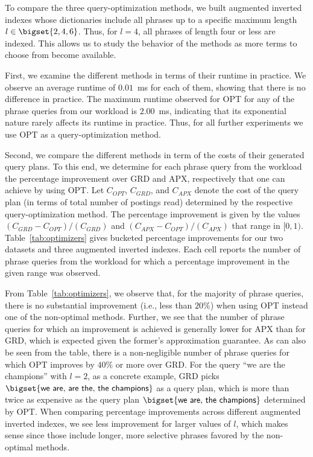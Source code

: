 To compare the three query-optimization methods, we built augmented
inverted indexes whose dictionaries include all phrases up to a
specific maximum length $l \in \bigset{2, 4, 6}$. Thus, for $l=4$, all
phrases of length four or less are indexed. This allows us to study
the behavior of the methods as more terms to choose from become
available.

First, we examine the different methods in terms of their runtime in
practice. We observe an average runtime of $0.01$~ms for each of them,
showing that there is no difference in practice. The maximum runtime
observed for OPT for any of the phrase queries from our workload is
$2.00$~ms, indicating that its exponential nature rarely affects its
runtime in practice. Thus, for all further experiments we use OPT as a
query-optimization method.

Second, we compare the different methods in term of the costs of their
generated query plans. To this end, we determine for each phrase query
from the workload the percentage improvement over GRD and APX,
respectively that one can achieve by using OPT. Let $C_{OPT}$,
$C_{GRD}$, and $C_{APX}$ denote the cost of the query plan (in terms
of total number of postings read) determined by the respective
query-optimization method. The percentage improvement is given by the
values $(C_{GRD} - C_{OPT})/(C_{GRD})$ and
$(C_{APX} - C_{OPT})/(C_{APX})$ that range in
$[0,1)$. Table~\ref{tab:optimizers} gives bucketed percentage
improvements for our two datasets and three augmented inverted
indexes. Each cell reports the number of phrase queries from the
workload for which a percentage improvement in the given range was
observed.

From Table~\ref{tab:optimizers}, we observe that, for the majority of phrase queries,
there is no substantial improvement (i.e., less than $20\%$) when
using OPT instead one of the non-optimal methods. Further, we see that
the number of phrase queries for which an improvement is achieved is
generally lower for APX than for GRD, which is expected given the
former's approximation guarantee. As can also be seen from the table,
there is a non-negligible number of phrase queries for which OPT
improves by $40\%$ or more over GRD. For the query \textsf{``we are
  the champions''} with $l=2$, as a concrete example, GRD picks
$\bigset{\mbox{\textsf{we are}, \textsf{are the}, \textsf{the
      champions}}}$
as a query plan, which is more than twice as expensive as the query
plan $\bigset{\mbox{\textsf{we are}, \textsf{the champions}}}$
determined by OPT. When comparing percentage improvements across
different augmented inverted indexes, we see less improvement for
larger values of $l$, which makes sense since those include longer,
more selective phrases favored by the non-optimal methods.

